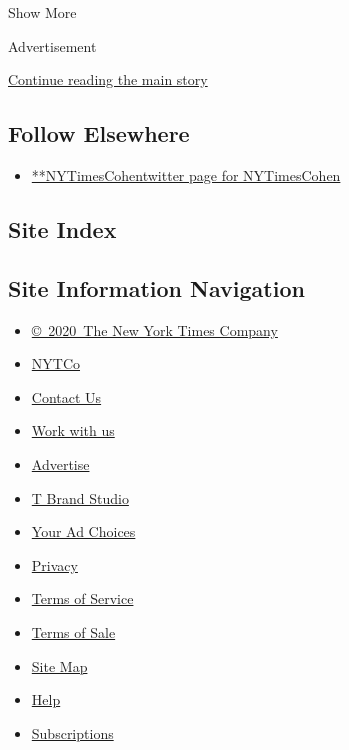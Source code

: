 Show More

Advertisement

\protect\hyperlink{after-mid2}{Continue reading the main story}

\hypertarget{follow-elsewhere}{%
\subsection{Follow Elsewhere}\label{follow-elsewhere}}

\begin{itemize}
\tightlist
\item
  \href{https://twitter.com/NYTimesCohen}{**NYTimesCohentwitter page for
  NYTimesCohen}
\end{itemize}

\hypertarget{site-index}{%
\subsection{Site Index}\label{site-index}}

\hypertarget{site-information-navigation}{%
\subsection{Site Information
Navigation}\label{site-information-navigation}}

\begin{itemize}
\tightlist
\item
  \href{https://help.nytimes.com/hc/en-us/articles/115014792127-Copyright-notice}{©~2020~The
  New York Times Company}
\end{itemize}

\begin{itemize}
\tightlist
\item
  \href{https://www.nytco.com/}{NYTCo}
\item
  \href{https://help.nytimes.com/hc/en-us/articles/115015385887-Contact-Us}{Contact
  Us}
\item
  \href{https://www.nytco.com/careers/}{Work with us}
\item
  \href{https://nytmediakit.com/}{Advertise}
\item
  \href{http://www.tbrandstudio.com/}{T Brand Studio}
\item
  \href{https://www.nytimes.com/privacy/cookie-policy\#how-do-i-manage-trackers}{Your
  Ad Choices}
\item
  \href{https://www.nytimes.com/privacy}{Privacy}
\item
  \href{https://help.nytimes.com/hc/en-us/articles/115014893428-Terms-of-service}{Terms
  of Service}
\item
  \href{https://help.nytimes.com/hc/en-us/articles/115014893968-Terms-of-sale}{Terms
  of Sale}
\item
  \href{https://spiderbites.nytimes.com}{Site Map}
\item
  \href{https://help.nytimes.com/hc/en-us}{Help}
\item
  \href{https://www.nytimes.com/subscription?campaignId=37WXW}{Subscriptions}
\end{itemize}
